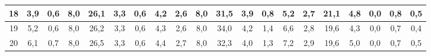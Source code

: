 \begin{sidewaystable}[]
\begin{tabular}{|c|c|c|c|c|c|c|c|c|c|c|c|c|c|c|c|c|c|c|c|}
    18 & 3,9                                              & 0,6                                              & 8,0                                              & 26,1                                             & 3,3                                              & 0,6                                              & 4,2                                              & 2,6                                              & 8,0                                              & 31,5                                             & 3,9                                              & 0,8                                              & 5,2                                              & 2,7                                              & 21,1                                             & 4,8                                              & 0,0                                              & 0,8                                              & 0,5                                              \\ \hline
    19 & 5,2                                              & 0,6                                              & 8,0                                              & 26,2                                             & 3,3                                              & 0,6                                              & 4,3                                              & 2,6                                              & 8,0                                              & 34,0                                             & 4,2                                              & 1,4                                              & 6,6                                              & 2,8                                              & 19,6                                             & 4,3                                              & 0,0                                              & 0,7                                              & 0,4                                              \\ \hline
    20 & 6,1                                              & 0,7                                              & 8,0                                              & 26,5                                             & 3,3                                              & 0,6                                              & 4,4                                              & 2,7                                              & 8,0                                              & 32,3                                             & 4,0                                              & 1,3                                              & 7,2                                              & 2,9                                              & 19,6                                             & 5,0                                              & 0,0                                              & 0,7                                              & 0,5                                              \\ \hline

\end{tabular}
\end{sidewaystable}
